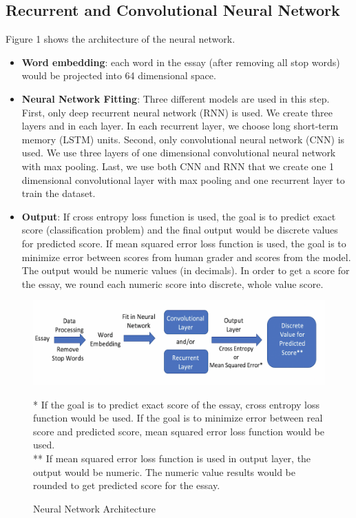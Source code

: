 \documentclass[11pt,conference]{IEEEtran}
\begin{document}
\subsection{Recurrent and Convolutional Neural Network}\label{AA}
Figure 1 shows the architecture of the neural network.
\begin{itemize} 
\item \textbf{Word embedding}: each word in the essay (after removing all stop words) would be projected into 64 dimensional space. 
\item \textbf{Neural Network Fitting}: Three different models are used in this step. First, only deep recurrent neural network (RNN) is used. We create three layers and in each layer. In each recurrent layer, we choose long short-term memory (LSTM) units. Second, only convolutional neural network (CNN) is used. We use three layers of one dimensional convolutional neural network with max pooling. Last, we use both CNN and RNN that we create one 1 dimensional convolutional layer with max pooling and one recurrent layer to train the dataset.  
\item \textbf{Output}: If cross entropy loss function is used, the goal is to predict exact score (classification problem) and the final output would be discrete values for predicted score. If mean squared error loss function is used, the goal is to minimize error between scores from human grader and scores from the model. The output would be numeric values (in decimals). In order to get a score for the essay, we round each numeric score into discrete, whole value score.
\end{itemize}

\begin{figure}[htbp]
\centerline{\includegraphics{fig1.png}}
\caption{Neural Network Architecture}
\footnotesize{* If the goal is to predict exact score of the essay, cross entropy loss function would be used. If the goal is to minimize error between real score and predicted score, mean squared error loss function would be used.}\\
\footnotesize{** If mean squared error loss function is used in output layer, the output would be numeric. The numeric value results would be rounded to get predicted score for the essay.}
\label{fig}
\end{figure}
\end{document}
